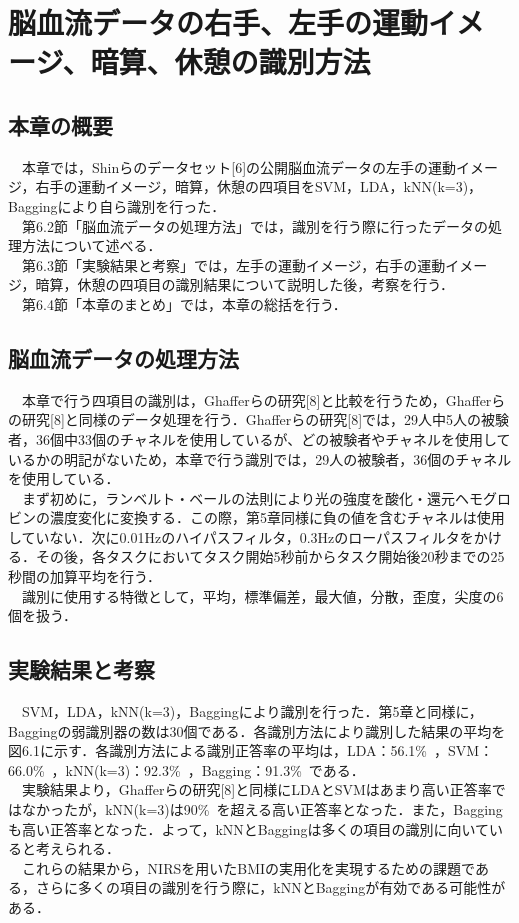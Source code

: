 \documentclass[a4j,12pt]{jreport}
\begin{document}
\chapter{脳血流データの右手、左手の運動イメージ、暗算、休憩の識別方法}
\section{本章の概要}
　本章では，Shinらのデータセット[6]の公開脳血流データの左手の運動イメージ，右手の運動イメージ，暗算，休憩の四項目をSVM，LDA，kNN(k=3)，Baggingにより自ら識別を行った．\\
　第6.2節「脳血流データの処理方法」では，識別を行う際に行ったデータの処理方法について述べる．\\
　第6.3節「実験結果と考察」では，左手の運動イメージ，右手の運動イメージ，暗算，休憩の四項目の識別結果について説明した後，考察を行う．\\
　第6.4節「本章のまとめ」では，本章の総括を行う．\\

\section{脳血流データの処理方法}
　本章で行う四項目の識別は，Ghafferらの研究[8]と比較を行うため，Ghafferらの研究[8]と同様のデータ処理を行う．Ghafferらの研究[8]では，29人中5人の被験者，36個中33個のチャネルを使用しているが、どの被験者やチャネルを使用しているかの明記がないため，本章で行う識別では，29人の被験者，36個のチャネルを使用している．\\
　まず初めに，ランベルト・ベールの法則により光の強度を酸化・還元ヘモグロビンの濃度変化に変換する．この際，第5章同様に負の値を含むチャネルは使用していない．次に0.01Hzのハイパスフィルタ，0.3Hzのローパスフィルタをかける．その後，各タスクにおいてタスク開始5秒前からタスク開始後20秒までの25秒間の加算平均を行う．\\
　識別に使用する特徴として，平均，標準偏差，最大値，分散，歪度，尖度の6個を扱う．\\

\section{実験結果と考察}
　SVM，LDA，kNN(k=3)，Baggingにより識別を行った．第5章と同様に，Baggingの弱識別器の数は30個である．各識別方法により識別した結果の平均を図6.1に示す．各識別方法による識別正答率の平均は，LDA：56.1\%\ ，SVM：66.0\%\ ，kNN(k=3)：92.3\%\ ，Bagging：91.3\%\ である．\\
　実験結果より，Ghafferらの研究[8]と同様にLDAとSVMはあまり高い正答率ではなかったが，kNN(k=3)は90\%\ を超える高い正答率となった．また，Baggingも高い正答率となった．よって，kNNとBaggingは多くの項目の識別に向いていると考えられる．\\
　これらの結果から，NIRSを用いたBMIの実用化を実現するための課題である，さらに多くの項目の識別を行う際に，kNNとBaggingが有効である可能性がある．\\
\end{document}
